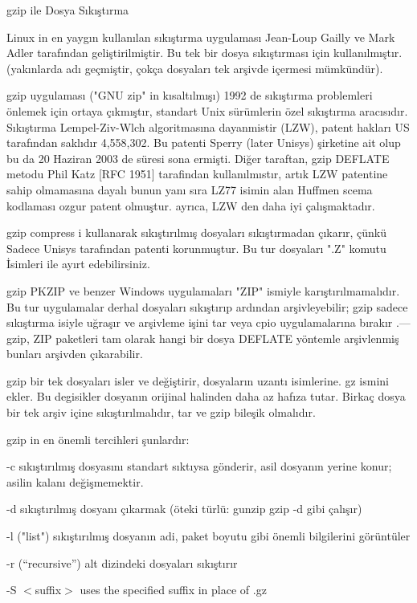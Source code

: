 \begin{section}{gzip ile Dosya Sıkıştırma}

Linux in en yaygın kullanılan sıkıştırma uygulaması Jean-Loup Gailly ve Mark Adler tarafından geliştirilmiştir. Bu tek bir dosya sıkıştırması için kullanılmıştır. (yakınlarda adı geçmiştir, çokça dosyaları tek arşivde içermesi mümkündür).

gzip uygulaması ("GNU zip" in kısaltılmışı) 1992 de sıkıştırma problemleri önlemek için ortaya çıkmıştır, standart Unix sürümlerin özel sıkıştırma aracısıdır. Sıkıştırma Lempel-Ziv-Wlch algoritmasına dayanmistir (LZW), patent hakları US tarafından saklıdır 4,558,302. Bu patenti Sperry (later Unisys) şirketine ait olup bu da 20 Haziran 2003 de süresi sona ermişti. Diğer taraftan, gzip DEFLATE metodu Phil Katz [RFC 1951] tarafindan  kullanılmıstır, artık LZW patentine sahip olmamasına dayalı bunun yanı sıra LZ77 isimin alan Huffmen scema kodlaması ozgur patent olmuştur. ayrıca, LZW den daha iyi çalışmaktadır.

gzip compress i kullanarak sıkıştırılmış dosyaları sıkıştırmadan çıkarır, çünkü
Sadece Unisys tarafından patenti korunmuştur. Bu tur dosyaları ".Z" komutu
İsimleri ile ayırt edebilirsiniz. 

gzip PKZIP ve benzer Windows uygulamaları "ZIP" ismiyle karıştırılmamalıdır. Bu tur uygulamalar derhal dosyaları sıkıştırıp ardından arşivleyebilir; gzip sadece sıkıştırma isiyle uğraşır ve arşivleme işini tar veya cpio uygulamalarına bırakır .—gzip, ZIP paketleri tam olarak hangi bir dosya DEFLATE yöntemle arşivlenmiş bunları arşivden çıkarabilir.

gzip bir tek dosyaları isler ve değiştirir, dosyaların uzantı isimlerine. gz ismini ekler. Bu degisikler dosyanın orijinal halinden daha az hafıza tutar. Birkaç dosya bir tek arşiv içine sıkıştırılmalıdır, tar ve gzip bileşik olmalıdır.

gzip in en önemli tercihleri şunlardır:

-c sıkıştırılmış dosyasını standart sıktıysa gönderir, asil dosyanın yerine konur;
asilin kalanı değişmemektir.

-d sıkıştırılmış dosyanı çıkarmak (öteki türlü: gunzip gzip -d gibi çalışır)

-l ("list") sıkıştırılmış dosyanın adi, paket boyutu gibi önemli bilgilerini görüntüler

-r (“recursive”) alt dizindeki dosyaları sıkıştırır

-S $<$suffix$>$ uses the specified suffix in place of .gz


\end{section}
